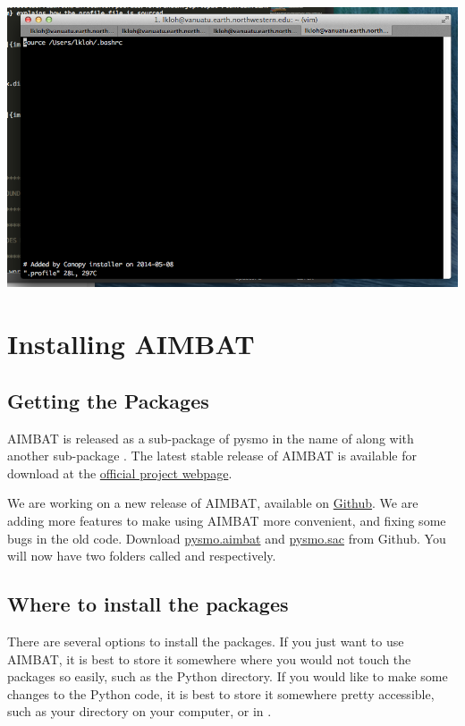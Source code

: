 \documentclass[letterpaper,10pt,english]{sphinxmanual}
\begin{document}
\includegraphics{profile_home.png}


\chapter{Installing AIMBAT}
\label{docfiles/install_aimbat::doc}\label{docfiles/install_aimbat:installing-aimbat}

\section{Getting the Packages}
\label{docfiles/install_aimbat:getting-the-packages}
AIMBAT is released as a sub-package of pysmo in the name of  along with another sub-package . The latest stable release of AIMBAT is available for download at the \href{http://www.earth.northwestern.edu/~xlou/aimbat.html}{official project webpage}.

We are working on a new release of AIMBAT, available on \href{https://github.com/pysmo}{Github}. We are adding more features to make using AIMBAT more convenient, and fixing some bugs in the old code. Download \href{https://github.com/pysmo/aimbat}{pysmo.aimbat} and \href{https://github.com/pysmo/sac}{pysmo.sac} from Github. You will now have two folders called  and  respectively.


\section{Where to install the packages}
\label{docfiles/install_aimbat:where-to-install-the-packages}
There are several options to install the packages. If you just want to use AIMBAT, it is best to store it somewhere where you would not touch the packages so easily, such as the Python  directory. If you would like to make some changes to the Python code, it is best to store it somewhere pretty accessible, such as your  directory on your computer, or in .
\end{document}
